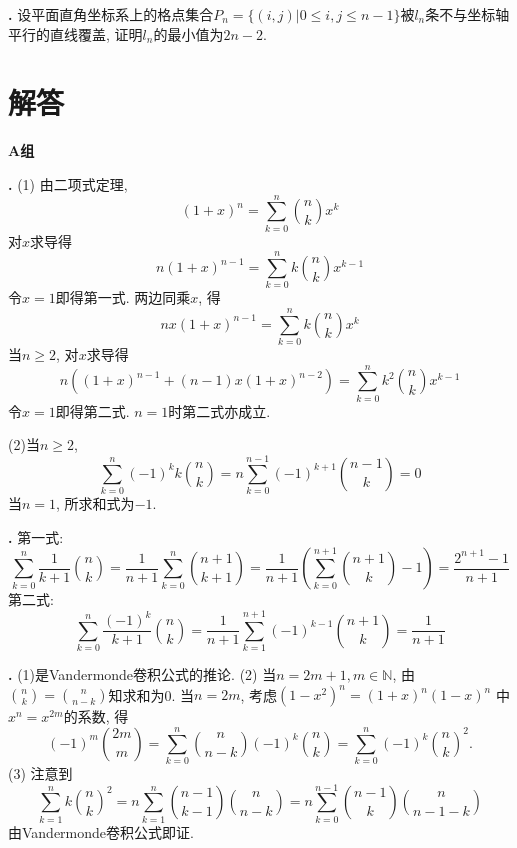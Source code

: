 \par \textbf{\theprobenum .} \cite{MaP} 设平面直角坐标系上的格点集合$P_n=\{(i,j)\vert 0\le i,j\le n-1\}$被$l_n$条不与坐标轴平行的直线覆盖, 证明$l_n$的最小值为$2n-2$.  

\section*{解答}

\par \textbf{A组}

\par \textbf{\thesolenum .} (1)\cite{IC} 由二项式定理, 
\begin{equation}
    (1+x)^n = \sum_{k=0}^n \binom{n}{k} x^k 
\end{equation}
对$x$求导得
\begin{equation}
    n(1+x)^{n-1} = \sum_{k=0}^n k\binom{n}{k} x^{k-1} 
\end{equation}
令$x=1$即得第一式. 两边同乘$x$, 得
\begin{equation}
    nx(1+x)^{n-1} = \sum_{k=0}^n k\binom{n}{k} x^{k} 
\end{equation}
当$n\ge 2$, 对$x$求导得
\begin{equation}
    n((1+x)^{n-1}+(n-1)x(1+x)^{n-2}) = \sum_{k=0}^n k^2\binom{n}{k} x^{k-1} 
\end{equation}
令$x=1$即得第二式. $n=1$时第二式亦成立. 
\par (2)当$n\ge 2$, 
\begin{equation}
    \sum_{k=0}^n (-1)^k k\binom{n}{k} = n\sum_{k=0}^{n-1} (-1)^{k+1} \binom{n-1}{k}=0
\end{equation}
当$n=1$, 所求和式为$-1$. 

\par \textbf{\thesolenum .} 第一式: 
\begin{equation}
\sum_{k=0}^n \frac{1}{k+1}\binom{n}{k}
=\frac{1}{n+1}\sum^{n}_{k=0}\binom{n+1}{k+1}=\frac{1}{n+1}\left(\sum^{n+1}_{k=0}\binom{n+1}{k}-1\right)=\frac{2^{n+1}-1}{n+1}
\end{equation}
第二式:
\begin{equation}
\sum_{k=0}^n \frac{(-1)^k}{k+1}\binom{n}{k}
=\frac{1}{n+1}\sum^{n+1}_{k=1}(-1)^{k-1}\binom{n+1}{k}=\frac{1}{n+1}
\end{equation}


\par \textbf{\thesolenum .}  (1)是Vandermonde卷积公式的推论. (2) \cite{IC} 当$n=2m+1,m\in\mathbb{N}$, 由$\binom{n}{k}=\binom{n}{n-k}$知求和为0. 当$n=2m$, 考虑$(1-x^2)^n=(1+x)^n(1-x)^n$
中$x^n=x^{2m}$的系数, 得
\begin{equation}
(-1)^m\binom{2m}{m}=\sum_{k=0}^n\binom{n}{n-k}(-1)^{k}\binom{n}{k}=
\sum_{k=0}^n(-1)^{k}\binom{n}{k}^2. 
\end{equation}
(3) 注意到
\begin{equation}
\sum_{k=1}^n k\binom{n}{k}^2=n\sum_{k=1}^n\binom{n-1}{k-1}\binom{n}{n-k}=n\sum_{k=0}^{n-1}\binom{n-1}{k}\binom{n}{n-1-k}
\end{equation}
由Vandermonde卷积公式即证.

